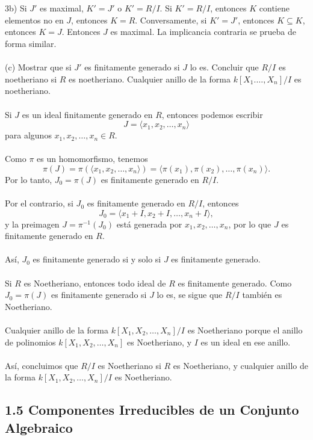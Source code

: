 \documentclass{article}
\begin{document}
\\
\\
3b) Si $J'$ es maximal, $K'=J'$ o $K'=R/I$. Si $K'=R/I$, entonces $K$ contiene elementos no en $J$, entonces $K=R$. Conversamente, si $K'=J'$, entonces $K \subseteq K$, entonces $K=J$. Entonces $J$ es maximal. La implicancia contraria se prueba de forma similar.
\\
\\
(c) Mostrar que si $J'$ es finitamente generado si $J$ lo es. Concluir que $R/I$ es noetheriano si $R$ es noetheriano. Cualquier anillo de la forma $k[X_1. \dots, X_n]/I$ es noetheriano.
\\
\\
Si \( J \) es un ideal finitamente generado en \( R \), entonces podemos escribir 
\[
J = \langle x_1, x_2, \dots, x_n \rangle
\]
para algunos \( x_1, x_2, \dots, x_n \in R \).
\\
\\
Como \( \pi \) es un homomorfismo, tenemos
\[
\pi(J) = \pi(\langle x_1, x_2, \dots, x_n \rangle) = \langle \pi(x_1), \pi(x_2), \dots, \pi(x_n) \rangle.
\]
Por lo tanto, \( J_0 = \pi(J) \) es finitamente generado en \( R/I \).
\\
\\
Por el contrario, si \( J_0 \) es finitamente generado en \( R/I \), entonces
\[
J_0 = \langle x_1 + I, x_2 + I, \dots, x_n + I \rangle,
\]
y la preimagen \( J = \pi^{-1}(J_0) \) está generada por \( x_1, x_2, \dots, x_n \), por lo que \( J \) es finitamente generado en \( R \).
\\
\\
Así, \( J_0 \) es finitamente generado si y solo si \( J \) es finitamente generado.
\\
\\
Si \( R \) es Noetheriano, entonces todo ideal de \( R \) es finitamente generado. Como \( J_0 = \pi(J) \) es finitamente generado si \( J \) lo es, se sigue que \( R/I \) también es Noetheriano.
\\
\\
Cualquier anillo de la forma \( k[X_1, X_2, \dots, X_n]/I \) es Noetheriano porque el anillo de polinomios \( k[X_1, X_2, \dots, X_n] \) es Noetheriano, y \( I \) es un ideal en ese anillo.
\\
\\
Así, concluimos que \( R/I \) es Noetheriano si \( R \) es Noetheriano, y cualquier anillo de la forma \( k[X_1, X_2, \dots, X_n]/I \) es Noetheriano.
\subsection*{1.5 Componentes Irreducibles de un Conjunto Algebraico}
\end{document}
